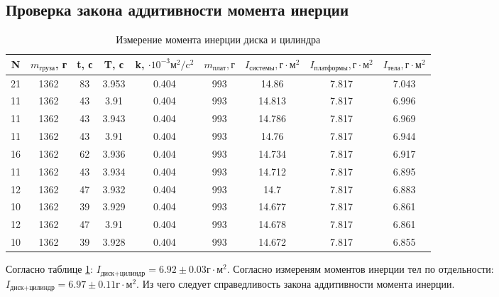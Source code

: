 \documentclass[a4paper,12pt]{article} %
\begin{document}
\subsection{Проверка закона аддитивности момента инерции}
\begin{table} \label{Диск+цилиндр} \caption{Измерение момента инерции диска и цилиндра} \begin{tabular}{|c|c|c|c|c|c|c|c|c|} \hline N & $m_\text{груза}$, г & t, с & T, с & k, $\cdot 10^{-3}\text{м}^2/\text{c}^2$ & $m_\text{плат}, г$ & $I_\text{системы}, \text{г}\cdot \text{м}^2$ &$I_\text{платформы}, \text{г}\cdot \text{м}^2$ & $I_\text{тела}, \text{г}\cdot \text{м}^2$ \\  \hline 21 & 1362 & 83 & 3.953 & 0.404 & 993 & 14.86 & 7.817 & 7.043 \\ \hline 11 & 1362 & 43 & 3.91 & 0.404 & 993 & 14.813 & 7.817 & 6.996 \\ \hline 11 & 1362 & 43 & 3.943 & 0.404 & 993 & 14.786 & 7.817 & 6.969 \\ \hline 11 & 1362 & 43 & 3.91 & 0.404 & 993 & 14.76 & 7.817 & 6.944 \\ \hline 16 & 1362 & 62 & 3.936 & 0.404 & 993 & 14.734 & 7.817 & 6.917 \\ \hline 11 & 1362 & 43 & 3.934 & 0.404 & 993 & 14.712 & 7.817 & 6.895 \\ \hline 12 & 1362 & 47 & 3.932 & 0.404 & 993 & 14.7 & 7.817 & 6.883 \\ \hline 10 & 1362 & 39 & 3.929 & 0.404 & 993 & 14.677 & 7.817 & 6.861 \\ \hline 12 & 1362 & 47 & 3.91 & 0.404 & 993 & 14.678 & 7.817 & 6.861 \\ \hline 10 & 1362 & 39 & 3.928 & 0.404 & 993 & 14.672 & 7.817 & 6.855 \\ \hline \end{tabular} \end{table}

Согласно таблице \ref{Диск+цилиндр}: $I_\text{диск+цилиндр}=6.92 \pm 0.03 \text{г}\cdot \text{м}^2$. Согласно измереням моментов инерции тел по отдельности:
$I_\text{диск+цилиндр}=6.97 \pm 0.11 \text{г}\cdot \text{м}^2$.
Из чего следует справедливость закона аддитивности момента инерции.
\end{document}
